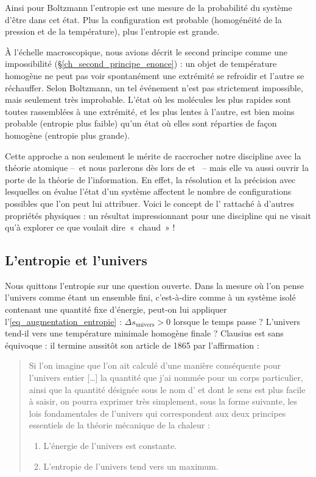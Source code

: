 		Ainsi pour Boltzmann l’entropie est une mesure de la probabilité du système d’être dans cet état. Plus la configuration est probable (homogénéité de la pression et de la température), plus l’entropie est grande. 
		
		À l’échelle macroscopique, nous avions décrit le second principe comme une impossibilité (\S\ref{ch_second_principe_enonce}) : un objet de température homogène ne peut pas voir spontanément une extrémité se refroidir et l’autre se réchauffer. Selon Boltzmann, un tel événement n’est pas strictement impossible, mais seulement très improbable. L’état où les molécules les plus rapides sont toutes rassemblées à une extrémité, et les plus lentes à l’autre, est bien moins probable (entropie plus faible) qu’un état où elles sont réparties de façon homogène (entropie plus grande).
		
		Cette approche a non seulement le mérite de raccrocher notre discipline avec la théorie atomique --\ et nous parlerons dès lors de  et \ -- mais elle va aussi ouvrir la porte de la théorie de l’information. En effet, la résolution et la précision avec lesquelles on évalue l’état d’un système affectent le nombre de configurations possibles que l’on peut lui attribuer. Voici le concept de l’ rattaché à d’autres propriétés physiques : un résultat impressionnant pour une discipline qui ne visait qu’à explorer ce que voulait dire~«~chaud~» !
		
	\subsection{L’entropie et l’univers}
	
		Nous quittons l’entropie sur une question ouverte. Dans la mesure où l’on pense l’univers comme étant un ensemble fini, c’est-à-dire comme à un système isolé contenant une quantité fixe d’énergie, peut-on lui appliquer l’\cref{eq_augmentation_entropie} : $\Delta s_\text{univers} > 0$ lorsque le temps passe ? L’univers tend-il vers une température minimale homogène finale ? Clausius est sans équivoque : il termine aussitôt son article de 1865 par l’affirmation :
			
			\begin{quote}
				Si l’on imagine que l’on ait calculé d’une manière conséquente pour l’univers entier […] la quantité que j’ai nommée  pour un corps particulier, ainsi que la quantité désignée sous le nom d’ et dont le sens est plus facile à saisir, on pourra exprimer très simplement, sous la forme suivante, les lois fondamentales de l’univers qui correspondent aux deux principes essentiels de la théorie mécanique de la chaleur :
					\begin{enumerate}
						\item L’énergie de l’univers est constante.
						\item L’entropie de l’univers tend vers un maximum.
					\end{enumerate}
			\end{quote}
		
